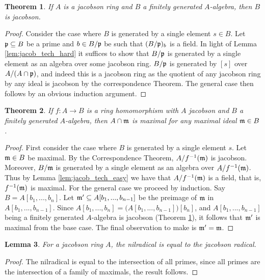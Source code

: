 \documentclass[12pt]{article}
\theoremstyle{plain}
\newtheorem{thm}{Theorem}[subsection] %
\newtheorem{lemma}[thm]{Lemma}
\theoremstyle{definition}
\begin{document}
	\begin{thm}\label{thm:fin_gen_jacob}
		If $A$ is a jacobson ring and $B$ a finitely generated $A$-algebra, then $B$ is jacobson.
	\end{thm}
	\begin{proof}
		Consider the case where $B$ is generated by a single element $s \in B$. Let $\frak{p} \subseteq B$ be a prime and $b \in B/\frak{p}$ be such that $(B/\frak{p})_b$ is a field. In light of Lemma \ref{lem:jacob_tech_hard} it suffices to show that $B/\frak{p}$ is generated by a single element as an algebra over some jacobson ring. $B/\frak{p}$ is generated by $[s]$ over $A/(A \cap \frak{p})$, and indeed this is a jacobson ring as the quotient of any jacobson ring by any ideal is jacobson by the correspondence Theorem. The general case then follows by an obvious induction argument.
	\end{proof}
	\begin{thm}\label{thm:jacob_preimage}
		If $f: A \to B$ is a ring homomorphism with $A$ jacobson and $B$ a finitely generated $A$-algebra, then $A \cap \frak{m}$ is maximal for any maximal ideal $\frak{m} \in B$.
	\end{thm}
	\begin{proof}
		First consider the case where $B$ is generated by a single element $s$. Let $\frak{m} \in B$ be maximal. By the Correspondence Theorem, $A/f^{-1}(\frak{m})$ is jacobson. Moreover, $B/\frak{m}$ is generated by a single element as an algebra over $A/f^{-1}(\frak{m})$. Thus by Lemma \ref{lem:jacob_tech_easy} we have that $A/f^{-1}(\frak{m})$ is a field, that is, $f^{-1}(\frak{m})$ is maximal. For the general case we proceed by induction. Say $B = A[b_1,...,b_n]$. Let $\frak{m}' \subseteq A[b_1,...,b_{n-1}]$ be the preimage of $\frak{m}$ in $A[b_1,...,b_{n-1}]$. Since $A[b_1,...,b_{n}] = \big(A[b_1,...,b_{n-1}]\big)[b_n]$, and $A[b_1,...,b_{n-1}]$ being a finitely generated $A$-algebra is jacobson (Theorem \ref{thm:fin_gen_jacob}), it follows that $\frak{m}'$ is maximal from the base case. The final observation to make is $\frak{m}' = \frak{m}$.
	\end{proof}
	\begin{lemma}\label{lem:jacob_easy}
		For a jacobson ring $A$, the nilradical is equal to the jacobson radical.
	\end{lemma}
	\begin{proof}
		The nilradical is equal to the intersection of all primes, since all primes are the intersection of a family of maximals, the result follows.
	\end{proof}
\end{document}
